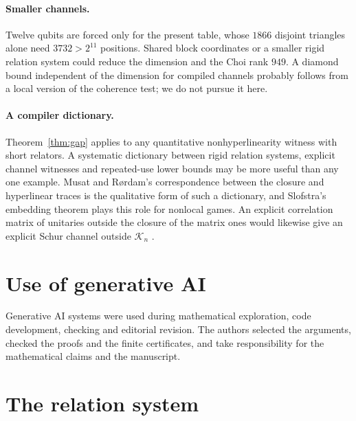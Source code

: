 \documentclass[11pt]{article}
\newcommand{\K}{\mathcal K}
\begin{document}
\paragraph{Smaller channels.}  Twelve qubits are forced only for the present table, whose $1866$ disjoint triangles alone need $3732>2^{11}$ positions.  Shared block coordinates or a smaller rigid relation system could reduce the dimension and the Choi rank $949$.  A diamond bound independent of the dimension for compiled channels probably follows from a local version of the coherence test; we do not pursue it here.

\paragraph{A compiler dictionary.}  Theorem~\ref{thm:gap} applies to any quantitative nonhyperlinearity witness with short relators.  A systematic dictionary between rigid relation systems, explicit channel witnesses and repeated-use lower bounds may be more useful than any one example.  Musat and R\o rdam's correspondence between the closure and hyperlinear traces \cite{MusatRordam21} is the qualitative form of such a dictionary, and Slofstra's embedding theorem \cite{Slofstra20} plays this role for nonlocal games.  An explicit correlation matrix of unitaries outside the closure of the matrix ones would likewise give an explicit Schur channel outside $\K_n$ \cite[Proposition~3.9 and Corollary~3.11]{Musat25}.

\section*{Use of generative AI}
Generative AI systems were used during mathematical exploration, code development, checking and editorial revision.  The authors selected the arguments, checked the proofs and the finite certificates, and take responsibility for the mathematical claims and the manuscript.

\appendix

\section{The relation system}\label{app:relations}
\end{document}
